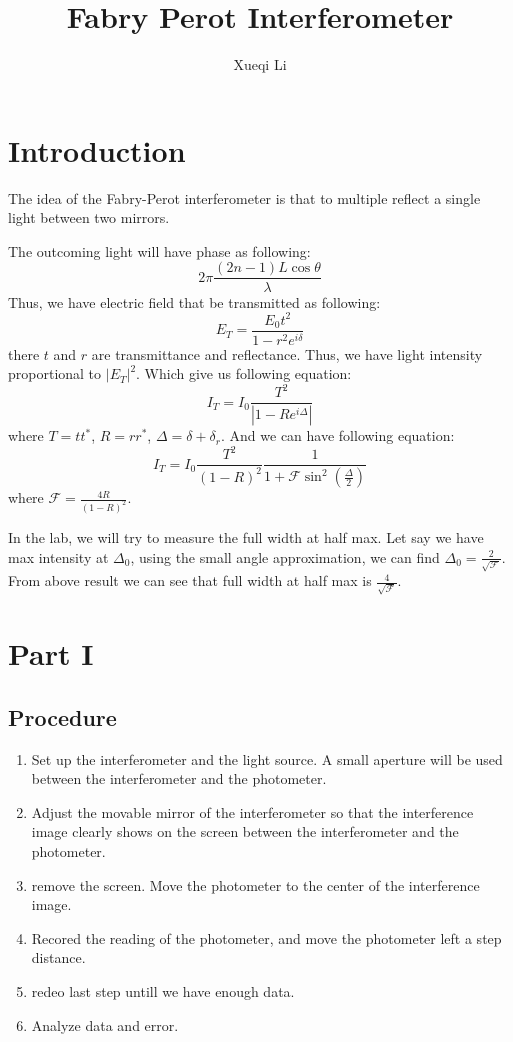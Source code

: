 \documentclass[aps,prl,reprint]{revtex4-1}
\begin{document}
\title{Fabry Perot Interferometer}
\author{Xueqi Li}
\noaffiliation


\maketitle

\section{Introduction}  
The idea of the Fabry-Perot interferometer is that to multiple reflect a single light between two mirrors.

The outcoming light will have phase as following:
\[
2 \pi \frac{(2n-1) L \cos\theta}{\lambda}
\]
Thus, we have electric field that be transmitted as following:
\[
E_T = \frac{E_0 t^2}{1-r^2e^{i\delta}}
\]
there $t$ and $r$ are transmittance and reflectance. Thus, we have light intensity proportional to $|E_T|^2$. Which give us following equation:
\[
I_T = I_0 \frac{T^2}{|1-Re^{i\Delta}|}
\]
where $T = tt^*$, $R = rr^*$, $\Delta = \delta + \delta_r$. And we can have following equation:
\[
I_T = I_0 \frac{T^2}{(1-R)^2}\frac{1}{1+\mathcal{F}\sin^2(\frac{\Delta}{2})}
\]
where $\mathcal{F} = \frac{4R}{(1-R)^2}$.

In the lab, we will try to measure the full width at half max. Let say we have max intensity at $\Delta_0$, using the small angle approximation, we can find $\Delta_0 = \frac{2}{\sqrt{\mathcal{F}}}$. From above result we can see that full width at half max is $\frac{4}{\sqrt{\mathcal{F}}}$.


\section{Part I}
\subsection{Procedure}
\begin{enumerate}
    \item Set up the interferometer and the light source. A small aperture will be used between the interferometer and the photometer.
    \item Adjust the movable mirror of the interferometer so that the interference image clearly shows on the screen between the interferometer and the photometer.
    \item remove the screen. Move the photometer to the center of the interference image.
    \item Recored the reading of the photometer, and move the photometer left a step distance.
    \item redeo last step untill we have enough data.
    \item Analyze data and error.
\end{enumerate}
\end{document}
